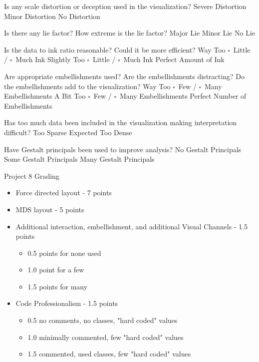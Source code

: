 \documentclass[a4paper,12pt]{article}
\begin{document}
        

	{Is any scale distortion or deception used in the visualization?}	
	{\choice Severe Distortion}
	{\choice Minor Distortion}
	{\choice No Distortion} 
        
	{Is there any lie factor? How extreme is the lie factor?}
	{\choice Major Lie}
	{\choice Minor Lie}
	{\choice No Lie} 

	{Is the data to ink ratio reasonable? Could it be more efficient?}
	{Way Too $\square$~Little / $\square$~Much Ink}
	{Slightly Too $\square$~Little / $\square$~Much Ink}
	{\choice Perfect Amount of Ink} 
        
	{Are appropriate embellishments used? Are the embellishments 
    	distracting? Do the embellishments add to the visualization?}
	{Way Too $\square$~Few / $\square$~Many Embellishments}
	{A Bit Too $\square$~Few / $\square$~Many Embellishments}
	{\choice Perfect Number of Embellishments} 
        
	{Has too much data been included in the visualization making 
    	interpretation difficult? } 
	{\choice Too Sparse}
	{\choice Expected}
	{\choice Too Dense} 
        
	{Have Gestalt principals been used to improve analysis?}
	{\choice No Gestalt Principals}
	{\choice Some Gestalt Principals}
	{\choice Many Gestalt Principals} 
        
\EndTable  
 



\newpage


\begin{center}
{\huge Project 8 Grading}
\end{center}

\begin{itemize}
	\item Force directed layout - 7 points
	\item MDS layout - 5 points
	\item Additional interaction, embellishment, and additional Visual Channels - 1.5 points 
		\begin{itemize}
    		\item 0.5 points for none used
    		\item 1.0 point for a few
            \item 1.5 points for many
		\end{itemize}
	\item Code Professionalism - 1.5 points
		\begin{itemize}
            \item 0.5 no comments, no classes, "hard coded" values
            \item 1.0 minimally commented, few "hard coded" values
            \item 1.5 commented, used classes, few "hard coded" values
		\end{itemize}
\end{itemize}
\end{document}

